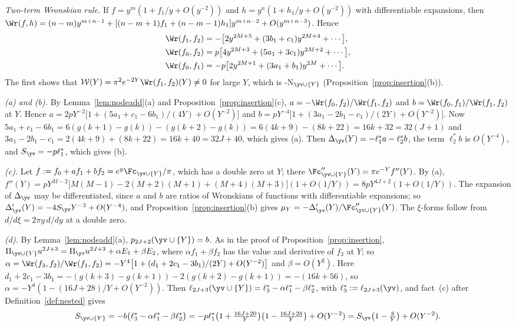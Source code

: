 \emph{Two-term Wronskian rule.} If $f=y^m(1+f_1/y+O(y^{-2}))$ and $h=y^n(1+h_1/y+O(y^{-2}))$ with differentiable expansions,
then $\Wr(f,h)=(n-m)y^{m+n-1}+[(n-m+1)f_1+(n-m-1)h_1]y^{m+n-2}+O(y^{m+n-3})$. Hence
\begin{align*}
\Wr(f_1,f_2)&=-\bigl[2y^{2M+5}+(3b_1+c_1)y^{2M+4}+\cdots\bigr],\\
\Wr(f_0,f_2)&=p\bigl[4y^{2M+3}+(5a_1+3c_1)y^{2M+2}+\cdots\bigr],\\
\Wr(f_0,f_1)&=-p\bigl[2y^{2M+1}+(3a_1+b_1)y^{2M}+\cdots\bigr].
\end{align*}
The first shows that $\mathcal W(Y)=\pi^2e^{-2Y}\Wr(f_1,f_2)(Y)\ne0$ for large $Y$, which is \hyp{N}$_{\yv\cup\{Y\}}$
(Proposition~\ref{prop:insertion}(b)).

\emph{(a) and (b).} By Lemma~\ref{lem:nodeadd}(a) and Proposition~\ref{prop:insertion}(c), $a=-\Wr(f_0,f_2)/\Wr(f_1,f_2)$
and $b=\Wr(f_0,f_1)/\Wr(f_1,f_2)$ at $Y$. Hence
$a=2pY^{-2}\bigl[1+(5a_1+c_1-6b_1)/(4Y)+O(Y^{-2})\bigr]$ and $b=pY^{-4}\bigl[1+(3a_1-2b_1-c_1)/(2Y)+O(Y^{-2})\bigr]$. Now
$5a_1+c_1-6b_1=6(g(k+1)-g(k))-(g(k+2)-g(k))=6(4k+9)-(8k+22)=16k+32=32(J+1)$ and
$3a_1-2b_1-c_1=2(4k+9)+(8k+22)=16k+40=32J+40$, which gives (a). Then
$\Delta_{\yv}(Y)=-\ell_1^*a-\ell_2^*b$, the term $\ell_2^*b$ is $O(Y^{-4})$, and $S_{\yv}=-p\ell_1^*$, which gives (b).

\emph{(c).} Let $f:=f_0+af_1+bf_2=e^y\Fc_{\yv\cup\{Y\}}/\pi$, which has a double zero at $Y$; there
$\Fc''_{\yv\cup\{Y\}}(Y)=\pi e^{-Y}f''(Y)$. By (a),
$f''(Y)=pY^{M-2}\bigl[M(M-1)-2(M+2)(M+1)+(M+4)(M+3)\bigr](1+O(1/Y))=8pY^{4J+2}(1+O(1/Y))$. The expansion of
$\Delta_{\yv}$ may be differentiated, since $a$ and $b$ are ratios of Wronskians of functions with differentiable
expansions; so $\Delta_{\yv}'(Y)=-4S_{\yv}Y^{-3}+O(Y^{-4})$, and Proposition~\ref{prop:insertion}(b) gives
$\mu_Y=-\Delta_{\yv}'(Y)/\Fc''_{\yv\cup\{Y\}}(Y)$. The $\xi$-forms follow from $d/d\xi=2\pi y\,d/dy$ at a double zero.

\emph{(d).} By Lemma~\ref{lem:nodeadd}(a), $p_{2J+2}(\yv\cup\{Y\})=b$. As in the proof of Proposition~\ref{prop:insertion},
$\Pi_{\yv\cup\{Y\}}u^{2J+3}=\Pi_{\yv}u^{2J+3}+\alpha E_1+\beta E_2$, where $\alpha f_1+\beta f_2$ has the value and derivative of $f_3$ at $Y$;
so $\alpha=\Wr(f_3,f_2)/\Wr(f_1,f_2)=-Y^4\bigl[1+(d_1+2c_1-3b_1)/(2Y)+O(Y^{-2})\bigr]$ and $\beta=O(Y^2)$. Here
$d_1+2c_1-3b_1=-(g(k+3)-g(k+1))-2(g(k+2)-g(k+1))=-(16k+56)$, so $\alpha=-Y^4(1-(16J+28)/Y+O(Y^{-2}))$. Then
$\ell_{2J+3}(\yv\cup\{Y\})=\ell_3^*-\alpha\ell_1^*-\beta\ell_2^*$, with $\ell_3^*:=\ell_{2J+3}(\yv)$, and fact~(c) after
Definition~\ref{def:nested} gives
\[
S_{\yv\cup\{Y\}}=-b\bigl(\ell_3^*-\alpha\ell_1^*-\beta\ell_2^*\bigr)=-p\ell_1^*\bigl(1+\tfrac{16J+20}{Y}\bigr)\bigl(1-\tfrac{16J+28}{Y}\bigr)+O(Y^{-2})
=S_{\yv}\bigl(1-\tfrac8Y\bigr)+O(Y^{-2}).
\]

